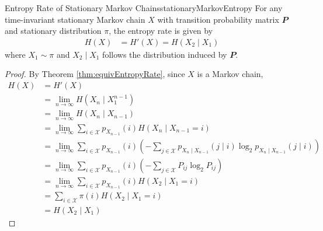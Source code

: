 \documentclass[math, code]{amznotes}
\theoremstyle{remark}
\begin{document}
\begin{probox}{Entropy Rate of Stationary Markov Chains}{stationaryMarkovEntropy}
    For any time-invariant stationary Markov chain $X$ with transition probability matrix $\mathbfit{P}$ and stationary distribution $\pi$, the entropy rate is given by 
    \begin{align*}
        H\left(X\right) & = H'\left(X\right) = H\left(X_2 \mid X_1\right)
    \end{align*}
    where $X_1 \sim \pi$ and $X_2 \mid X_1$ follows the distribution induced by $\mathbfit{P}$.
    \tcblower
    \begin{proof}
        By Theorem \ref{thm:equivEntropyRate}, since $X$ is a Markov chain,
        \begin{align*}
            H\left(X\right) & = H'\left(X\right) \\
            & = \lim_{n \to \infty}H\left(X_n \mid X_1^{n - 1}\right) \\
            & = \lim_{n \to \infty}H\left(X_n \mid X_{n - 1}\right) \\
            & = \lim_{n \to \infty}\sum_{i \in \mathcal{X}}p_{X_{n - 1}}\left(i\right)H\left(X_n \mid X_{n - 1} = i\right) \\
            & = \lim_{n \to \infty}\sum_{i \in \mathcal{X}}p_{X_{n - 1}}\left(i\right)\left(-\sum_{j \in \mathcal{X}}p_{X_n \mid X_{n - 1}}\left(j \mid i\right)\log_2p_{X_n \mid X_{n - 1}}\left(j \mid i\right)\right) \\
            & = \lim_{n \to \infty}\sum_{i \in \mathcal{X}}p_{X_{n - 1}}\left(i\right)\left(-\sum_{j \in \mathcal{X}}P_{ij}\log_2P_{ij}\right) \\
            & = \lim_{n \to \infty}\sum_{i \in \mathcal{X}}p_{X_{n - 1}}\left(i\right)H\left(X_2 \mid X_1 = i\right) \\
            & = \sum_{i \in \mathcal{X}}\pi\left(i\right)H\left(X_2 \mid X_1 = i\right) \\
            & = H\left(X_2 \mid X_1\right)
        \end{align*}
    \end{proof}
\end{probox}
\end{document}
